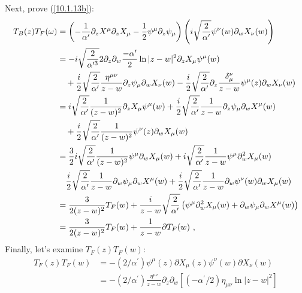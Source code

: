 \begin{tcolorbox}[breakable]
	Next, prove (\ref{10.1.13b}): %
	\begin{align*}
		T_{B}(z)T_{F}(\omega ) &=\left( -\frac{1}{\alpha ^{\prime }}\partial
		_{z}X^{\mu }\partial _{z}X_{\mu }-\frac{1}{2}\psi ^{\mu }\partial _{z}\psi
		_{\mu }\right) \left( \mi\sqrt{\frac{2}{\alpha ^{\prime }}}\psi ^{\nu
		}(w)\partial _{w}X_{\nu }(w)\right)  \\
		&=-\mi\sqrt{\frac{2}{\alpha ^{\prime 3}}}2\partial _{z}\partial _{w}\frac{%
			-\alpha ^{\prime }}{2}\ln |z-w|^{2}\partial _{z}X_{\mu }\psi ^{\mu }(w) \\
		&\quad+\frac{\mi}{2}\sqrt{\frac{2}{\alpha ^{\prime }}}\frac{\eta ^{\mu \nu }}{z-w}%
		\partial _{z}\psi _{\mu }\partial _{w}X_{\nu }(w)-\frac{\mi}{2}\sqrt{\frac{2}{%
				\alpha ^{\prime }}}\partial _{z}\frac{\delta _{\mu }^{\nu }}{z-w}\psi ^{\mu
		}(z)\partial _{w}X_{\nu }(w) \\
		&=\mi\sqrt{\frac{2}{\alpha ^{\prime }}}\frac{1}{(z-w)^{2}}\partial _{z}X_{\mu
		}\psi ^{\mu }(w)+\frac{\mi}{2}\sqrt{\frac{2}{\alpha ^{\prime }}}\frac{1}{z-w}%
		\partial _{z}\psi _{\mu }\partial _{w}X^{\mu }(w) \\
		&\quad+\frac{\mi}{2}\sqrt{\frac{2}{\alpha ^{\prime }}}\frac{1}{(z-w)^{2}}\psi
		^{\nu }(z)\partial _{w}X_{\mu }(w) \\
		&=\frac{3}{2}\mi\sqrt{\frac{2}{\alpha ^{\prime }}}\frac{1}{(z-w)^{2}}\psi
		^{\mu }\partial _{w}X_{\mu }(w)+\mi\sqrt{\frac{2}{\alpha ^{\prime }}}\frac{1}{%
			z-w}\psi ^{\mu }\partial _{w}^{2}X_{\mu }(w) \\
		&\quad\frac{\mi}{2}\sqrt{\frac{2}{\alpha ^{\prime }}}\frac{1}{z-w}\partial
		_{w}\psi _{\mu }\partial _{w}X^{\mu }(w)+\frac{\mi}{2}\sqrt{\frac{2}{\alpha
				^{\prime }}}\frac{1}{z-w}\partial _{w}\psi ^{\nu }(w)\partial _{w}X_{\mu }(w)\\
		&=\frac{3}{2(z-w)^{2}}T_{F}(w)+\frac{\mi}{z-w}\sqrt{\frac{2}{\alpha ^{\prime }%
		}}\left( \psi ^{\mu }\partial _{w}^{2}X_{\mu }(w)+\partial _{w}\psi _{\mu
		}\partial _{w}X^{\mu }(w)\right)  \\
		&=\frac{3}{2(z-w)^{2}}T_{F}(w)+\frac{1}{z-w}\partial T_{F}(w)\text{ ,}
	\end{align*}
	Finally, let's examine $T_{F}(z)T_{F}(w)$:
	\begin{align*}
		T_{F}(z)T_{F}(w) &=-(2/\alpha ^{\prime })\psi ^{\mu }(z)\partial X_{\mu
		}(z)\psi ^{\nu }(w)\partial X_{\nu }(w) \\
		&=-(2/\alpha ^{\prime })\frac{\eta ^{\mu \nu }}{z-w}\partial _{z}\partial
		_{w}[(-\alpha ^{\prime }/2)\eta _{\mu \nu }\ln |z-w|^{2}] \\

\end{align*}
\end{tcolorbox}
